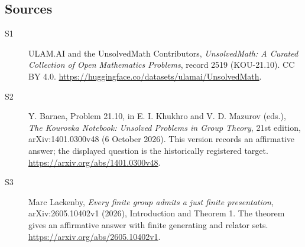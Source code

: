 \documentclass[11pt]{article}
\begin{document}
\subsection{Sources}
\begin{description}
\item[\hypertarget{source:2519:1}{S1}] ULAM.AI and the UnsolvedMath Contributors, \emph{UnsolvedMath: A Curated Collection of Open Mathematics Problems}, record 2519 (KOU-21.10). CC BY 4.0. \url{https://huggingface.co/datasets/ulamai/UnsolvedMath}.
\item[\hypertarget{source:2519:2}{S2}] Y. Barnea, Problem 21.10, in E. I. Khukhro and V. D. Mazurov (eds.), \emph{The Kourovka Notebook: Unsolved Problems in Group Theory}, 21st edition, arXiv:1401.0300v48 (6 October 2026). This version records an affirmative answer; the displayed question is the historically registered target. \url{https://arxiv.org/abs/1401.0300v48}.
\item[\hypertarget{source:2519:3}{S3}] Marc Lackenby, \emph{Every finite group admits a just finite presentation}, arXiv:2605.10402v1 (2026), Introduction and Theorem 1. The theorem gives an affirmative answer with finite generating and relator sets. \url{https://arxiv.org/abs/2605.10402v1}.
\end{description}
\label{end:2519}
\end{document}
